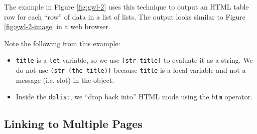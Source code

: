 \documentclass [11pt]{book}
\begin{document}
The example in Figure 
\ref{fig:gwl-2}  uses this technique to output an HTML table row for each ``row'' of data in a list of lists.
The output looks similar to Figure 
\ref{fig:gwl-2-image} in a web browser.



Note the following from this example:

\begin{itemize}

\item \texttt{title} is a \texttt{let} variable, so we use \texttt{(str title)} to evaluate it as a string. We do not use \texttt{(str (the title))} because \texttt{title} is a local variable and not a message (i.e. slot) in the object.

\item Inside the \texttt{dolist}, we ``drop back into'' HTML mode using the \texttt{htm} operator.

\end{itemize}





\subsection{Linking to Multiple Pages}

\label{subsec:linkingtomultiplepages}
\end{document}
